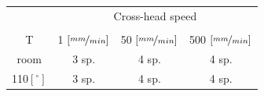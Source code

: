\documentclass[first,firstsupp,lastsupp,last,hyperref,table]{ETHclass}
\begin{document}
\begin{frame}
\begin{columns}[c]
\begin{column}{0.5\textwidth}
\begin{figure}
\end{figure}
\end{column}
\end{columns}
\begin{table}
\centering
\small
\begin{tabular}{cccc}
&\multicolumn{3}{c}{Cross-head speed}\\
\cline{2-4}\\[-7.5pt]
T&1 $\left[\nicefrac{mm}{min}\right]$&50 $\left[\nicefrac{mm}{min}\right]$&500 $\left[\nicefrac{mm}{min}\right]$\\
\midrule
room&3 sp.&4 sp.&4 sp.\\
110$\left[^{\circ}\right]$&3 sp.&4 sp.&4 sp.\\
\end{tabular}
\end{table}
\end{frame}

\begin{frame}[plain]
\frametitle{}
\end{frame}
\end{document}
